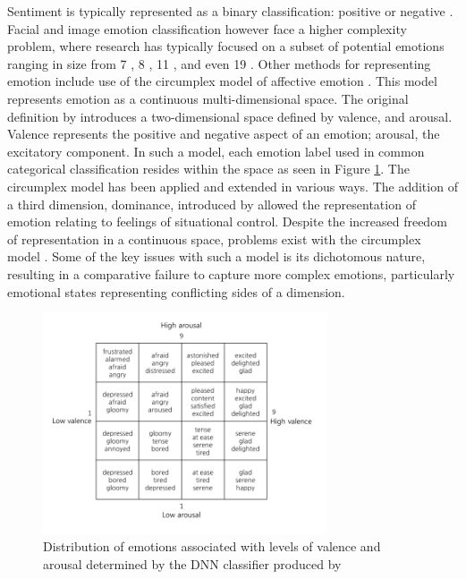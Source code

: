 \documentclass{article}
\begin{document}
Sentiment is typically represented as a binary classification: positive or negative \citep{yang2018visual, chen2014deepsentibank}.
Facial and image emotion classification however face a higher complexity problem, where research has typically focused on a subset of potential emotions ranging in size from 7 \citep{ali2017emotional}, 8 \citep{machajdik2010affective}, 11 \citep{wangarttalk}, and even 19 \citep{mohammad2018wikiart}.
Other methods for representing emotion include use of the circumplex model of affective emotion \citep{russell1980circumplex, bradley1994measuring}.
This model represents emotion as a continuous multi-dimensional space.
The original definition by \citet{russell1980circumplex} introduces a two-dimensional space defined by valence, and arousal.
Valence represents the positive and negative aspect of an emotion; arousal, the excitatory component.
In such a model, each emotion label used in common categorical classification resides within the space as seen in Figure \ref{fig:valence-arousal}.
The circumplex model has been applied and extended in various ways.
The addition of a third dimension, dominance, introduced by \citet{bradley1994measuring} allowed the representation of emotion relating to feelings of situational control.
Despite the increased freedom of representation in a continuous space, problems exist with the circumplex model \citep{larsen1992promises}.
Some of the key issues with such a model is its dichotomous nature, resulting in a comparative failure to capture more complex emotions, particularly emotional states representing conflicting sides of a dimension.

\begin{figure}[h!]
	\centering
	\includegraphics[width=0.75\textwidth]{images/valence-arousal-grid.png}
	\caption{Distribution of emotions associated with levels of valence and arousal determined by the DNN classifier produced by \citet{kim2018building}}
	\label{fig:valence-arousal}
\end{figure}
\end{document}
